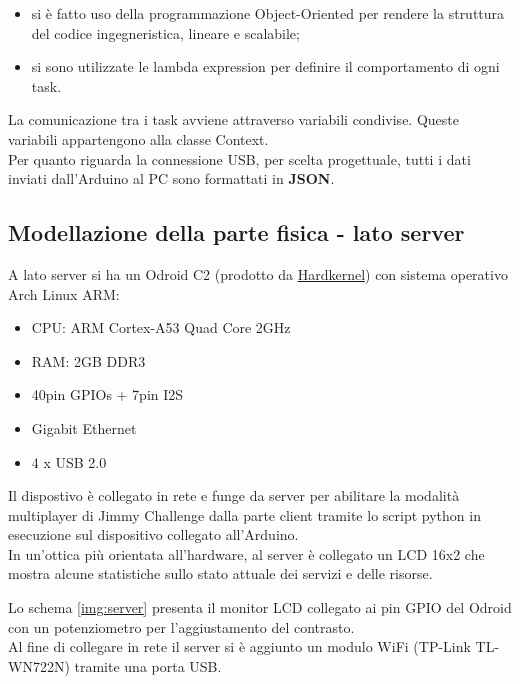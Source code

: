 \begin{itemize}	
	\item si è fatto uso della programmazione Object-Oriented per rendere la struttura del codice ingegneristica, lineare e scalabile;
	\item si sono utilizzate le lambda expression per definire il comportamento di ogni task.
\end{itemize}
La comunicazione tra i task avviene attraverso variabili condivise. Queste variabili appartengono alla classe Context.\\
Per quanto riguarda la connessione USB, per scelta progettuale, tutti i dati inviati dall'Arduino al PC sono formattati in \textbf{JSON}.

\subsection{Modellazione della parte fisica - lato server}
A lato server si ha un Odroid C2 (prodotto da \href{http://www.hardkernel.com/main/main.php}{Hardkernel}) con sistema operativo Arch Linux ARM:
\begin{itemize}
	\item CPU: ARM Cortex-A53 Quad Core 2GHz
	\item RAM: 2GB DDR3
	\item 40pin GPIOs + 7pin I2S
	\item Gigabit Ethernet
	\item 4 x USB 2.0
\end{itemize}
Il dispostivo è collegato in rete e funge da server per abilitare la modalità multiplayer di Jimmy Challenge dalla parte client tramite lo script python in esecuzione sul dispositivo collegato all'Arduino.\\
In un'ottica più orientata all'hardware, al server è collegato un LCD 16x2 che mostra alcune statistiche sullo stato attuale dei servizi e delle risorse.

Lo schema \ref{img:server} presenta il monitor LCD collegato ai pin GPIO del Odroid con un potenziometro per l'aggiustamento del contrasto.\\
Al fine di collegare in rete il server si è aggiunto un modulo WiFi (TP-Link TL-WN722N) tramite una porta USB.

